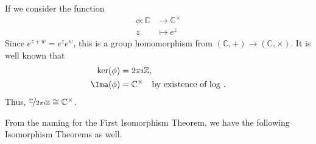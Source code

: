 \begin{example}
    If we consider the function
    \begin{equation*}
    \begin{aligned}
      \phi\colon \mathbb{C} & \longrightarrow \mathbb{C}^\times      \\
      z          & \longmapsto e^z 
    \end{aligned}
    \end{equation*}
    Since \(e^{z + w} = e^z e^w\), this is a group homomorphism from \((\mathbb{C}, +) \to (\mathbb{C}, \times)\). It is well known that
    \begin{align*}
        \ker(\phi) &= 2\pi i \mathbb{Z},\\
        \Ima(\phi) &= \mathbb{C}^\times \quad \text{by existence of \(\log\) }.
    \end{align*}
    Thus, \(\nicefrac{\mathbb{C}}{2\pi i \mathbb{Z}} \cong \mathbb{C}^\times\).
\end{example}

From the naming for the First Isomorphism Theorem, we have the following Isomorphism Theorems as well.

